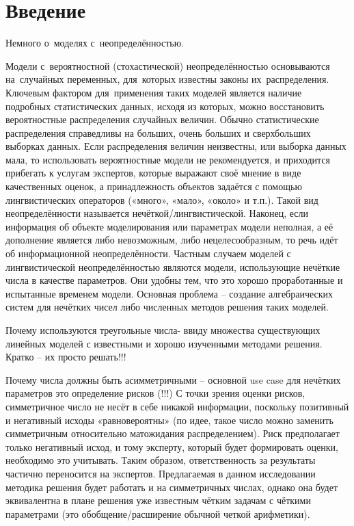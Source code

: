 \chapter*{Введение}

Немного о~моделях с~неопределённостью.

Модели с~вероятностной (стохастической) неопределённостью основываются на~случайных переменных, для~которых известны законы их~распределения. Ключевым фактором для~применения таких моделей является наличие подробных статистических данных, исходя из которых, можно восстановить вероятностные распределения случайных величин. Обычно статистические распределения справедливы на больших, очень больших и сверхбольших выборках данных. Если распределения величин неизвестны, или выборка данных мала, то использовать вероятностные модели не рекомендуется, и приходится прибегать к услугам экспертов, которые выражают своё мнение в виде качественных оценок, а принадлежность объектов задаётся с помощью лингвистических операторов («много», «мало», «около» и т.п.). Такой вид неопределённости называется нечёткой/лингвистической. Наконец, если информация об объекте моделирования или параметрах модели неполная, а её дополнение является либо невозможным, либо нецелесообразным, то речь идёт об информационной неопределённости.
Частным случаем моделей с лингвистической неопределённостью являются модели, использующие нечёткие числа в качестве параметров. Они удобны тем, что это хорошо проработанные и испытанные временем модели. Основная проблема – создание алгебраических систем для нечётких чисел либо численных методов решения таких моделей.

Почему используются треугольные числа- ввиду множества существующих линейных моделей с известными и хорошо изученными методами решения. Кратко – их просто решать!!!

Почему числа должны быть асимметричными – основной use case для нечётких параметров это определение рисков (!!!) С точки зрения оценки рисков, симметричное число не несёт в себе никакой информации, поскольку позитивный и негативный исходы «равновероятны» (по идее, такое число можно заменить симметричным относительно матожидания распределением). Риск предполагает только негативный исход, и тому эксперту, который будет формировать оценки, необходимо это учитывать. Таким образом, ответственность за результаты частично переносится на экспертов. Предлагаемая в данном исследовании методика решения будет работать и на симметричных числах, однако она будет эквивалентна в плане решения уже известным чётким задачам с чёткими параметрами (это обобщение/расширение обычной четкой арифметики).